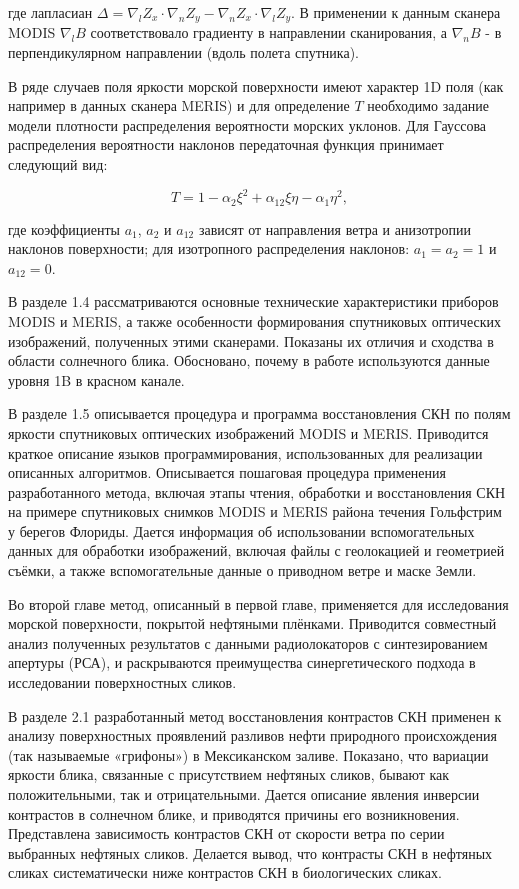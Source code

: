 где лапласиан $\Delta =\nabla _{l} Z_{x} \cdot \nabla _{n} Z_{y}^{} -\nabla _{n} Z_{x} \cdot \nabla _{l} Z_{y}^{} $. В применении к данным сканера MODIS $\nabla _{l} B$ соответствовало градиенту в направлении сканирования, а $\nabla _{n} B$ - в перпендикулярном направлении (вдоль полета спутника). 

В ряде случаев поля яркости морской поверхности имеют характер 1D поля (как например в данных сканера MERIS) и для определение $T$ необходимо задание модели плотности распределения вероятности морских уклонов. Для Гауссова распределения вероятности наклонов передаточная функция принимает следующий вид:

\begin{equation} \label{5)} T=1-\alpha _{2} \xi ^{2} +\alpha _{12} \xi \eta -\alpha _{1} \eta ^{2} ,  \end{equation} 

где коэффициенты $a_{1} $, $a_{2} $ и $a_{12} $ зависят от направления ветра и анизотропии наклонов поверхности; для изотропного распределения наклонов: $a_{1} =a_{2} =1$ и $a_{12} =0$. 

В разделе 1.4 рассматриваются основные технические характеристики приборов MODIS и MERIS, а также особенности формирования спутниковых оптических изображений, полученных этими сканерами. Показаны их отличия и сходства в области солнечного блика. Обосновано, почему в работе используются данные уровня 1B в красном канале.

В разделе 1.5 описывается процедура и программа восстановления СКН по полям яркости спутниковых оптических изображений MODIS и MERIS. Приводится краткое описание языков программирования, использованных для реализации описанных алгоритмов. Описывается пошаговая процедура применения разработанного метода, включая этапы чтения, обработки и восстановления СКН на примере спутниковых снимков MODIS и MERIS района течения Гольфстрим у берегов Флориды. Дается информация об использовании вспомогательных данных для обработки изображений, включая файлы с геолокацией и геометрией съёмки, а также вспомогательные данные о приводном ветре и маске Земли. 

Во второй главе метод, описанный в первой главе, применяется для исследования морской поверхности, покрытой нефтяными плёнками. Приводится совместный анализ полученных результатов с данными радиолокаторов с синтезированием апертуры (РСА), и раскрываются преимущества синергетического подхода в исследовании поверхностных сликов.

В разделе 2.1 разработанный метод восстановления контрастов СКН применен к анализу поверхностных проявлений разливов нефти природного происхождения (так называемые «грифоны») в Мексиканском заливе. Показано, что вариации яркости блика, связанные с присутствием нефтяных сликов, бывают как положительными, так и отрицательными. Дается описание явления инверсии контрастов в солнечном блике, и приводятся причины его возникновения. Представлена зависимость контрастов СКН от скорости ветра по серии выбранных нефтяных сликов. Делается вывод, что контрасты СКН в нефтяных сликах систематически ниже контрастов СКН в биологических сликах. 

